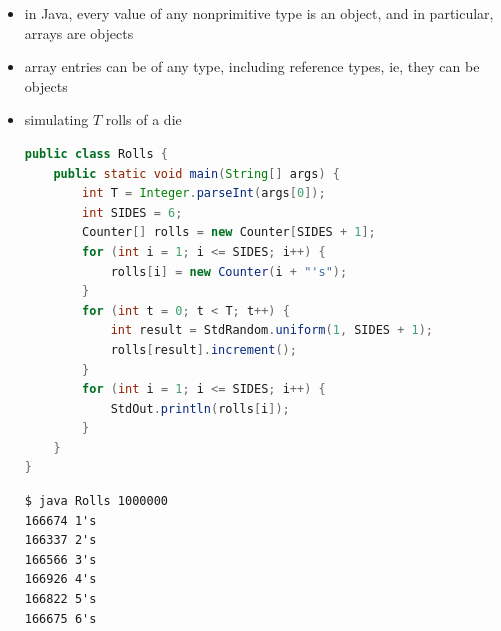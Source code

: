 \documentclass[8pt,a4paper,compress]{beamer}
\begin{document}
\begin{frame}[fragile]
\begin{itemize}
\item in Java, every value of any nonprimitive type is an object, and in particular, arrays are objects 

\item array entries can be of any type, including reference types, ie, they can be objects

\item simulating $T$ rolls of a die
\begin{lstlisting}[language=Java]
public class Rolls {
    public static void main(String[] args) {
        int T = Integer.parseInt(args[0]);
        int SIDES = 6;
        Counter[] rolls = new Counter[SIDES + 1];
        for (int i = 1; i <= SIDES; i++) {
            rolls[i] = new Counter(i + "'s");
        }
        for (int t = 0; t < T; t++) {
            int result = StdRandom.uniform(1, SIDES + 1);
            rolls[result].increment();
        }
        for (int i = 1; i <= SIDES; i++) {
            StdOut.println(rolls[i]);
        }
    }
}
\end{lstlisting}

\begin{lstlisting}[language={}]
$ java Rolls 1000000
166674 1's
166337 2's
166566 3's
166926 4's
166822 5's
166675 6's
\end{lstlisting}
\end{itemize}
\end{frame}
\end{document}
